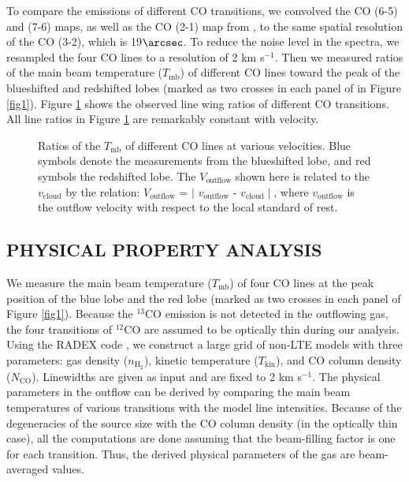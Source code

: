 To compare the emissions of different CO transitions, we convolved the CO (6-5) and (7-6) maps, as well as the CO (2-1) map from \citet{2009ApJ...696...66Q}, to the same spatial resolution of the CO (3-2), which is 19${\arcsec}$. To reduce the noise level in the spectra, we resampled the four CO lines to a resolution of 2 km s$^{-1}$. Then we measured ratios of the main beam temperature ($T_{\mathrm{mb}}$) of different CO lines toward the peak of the blueshifted and redshifted lobes (marked as two crosses in each panel of  in Figure \ref{fig1}). Figure \ref{fig2} shows the observed line wing ratios of different CO transitions.  All line ratios in Figure \ref{fig2} are remarkably constant with velocity.

\begin{figure}[tbp]
\caption{Ratios of the $T_{\mathrm{mb}}$ of different CO lines at various velocities. Blue symbols denote the measurements from the blueshifted lobe, and red symbols the redshifted lobe. The $V_{\mathrm{outflow}}$ shown here is related to the $v_{\mathrm{cloud}}$ by the relation: $V_{\mathrm{outflow}}$ = $\mid$ $v_{\mathrm{outflow}}$ - $v_{\mathrm{cloud}}\mid$, where $v_{\mathrm{outflow}}$ is the outflow velocity with respect to the local standard of rest. \label{fig2}}
\end{figure}

\subsection{PHYSICAL PROPERTY ANALYSIS}
We measure the main beam temperature ($T_{\mathrm{mb}}$) of four CO lines at the peak position of the blue lobe and the red lobe (marked as two crosses in each panel of Figure \ref{fig1}). Because the $^{13}$CO emission is not detected in the outflowing gas, the four transitions of $^{12}$CO are assumed to be optically thin during our analysis. Using the RADEX code \citep{2007A&A...468..627V}, we construct a large grid of non-LTE models with three parameters: gas density ($n_{\mathrm{H}_2}$), kinetic temperature ($T_{\mathrm{kin}}$), and CO column density ($N_{\mathrm{CO}}$). Linewidths are given as input and are fixed to 2 km s$^{-1}$. The physical parameters in the outflow can be derived by comparing the main beam temperatures of various transitions with the model line intensities. Because of the degeneracies of the source size with the CO column density (in the optically thin case), all the computations are done assuming that the beam-filling factor is one for each transition. Thus, the derived physical parameters of the gas are beam-averaged values. 

